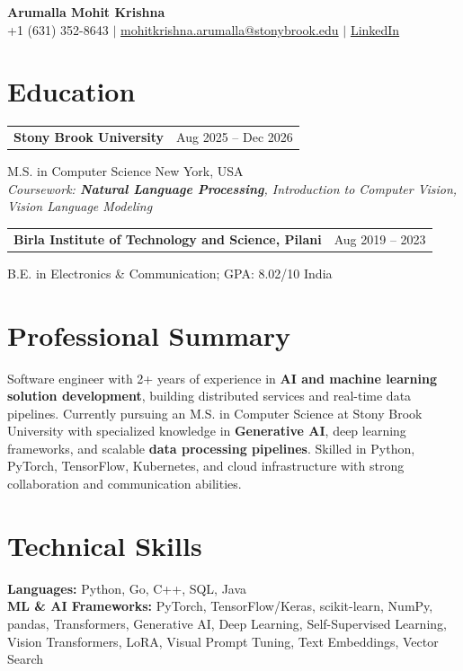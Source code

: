 \documentclass[letterpaper,10pt]{article}
\makeatletter
\newcommand{\entry}[2]{%
  \noindent
  \begin{tabularx}{\linewidth}
    {@{}>{\raggedright\arraybackslash}X@{\hspace{6pt}}r@{}}
    \textbf{#1} & #2
  \end{tabularx}\par
}
\makeatother
\begin{document}
\begin{center}
    {\LARGE\bfseries Arumalla Mohit Krishna}\\[3pt]
    +1 (631) 352-8643 $|$
    \href{mailto:mohitkrishna.arumalla@stonybrook.edu}
    {mohitkrishna.arumalla@stonybrook.edu} $|$
    \href{https://linkedin.com/in/mohit-krishna-arumalla}
    {LinkedIn}
\end{center}
\vspace{-8pt}

\section{Education}

\entry
  {\textbf{Stony Brook University}}
  {Aug 2025 -- Dec 2026}

M.S. in Computer Science \hfill New York, USA\\
\textit{
Coursework: \textbf{Natural Language Processing},
Introduction to Computer Vision, Vision Language Modeling
}
\vspace{3pt}

\entry
  {\textbf{Birla Institute of Technology and Science, Pilani}}
  {Aug 2019 -- 2023}

B.E. in Electronics \& Communication; GPA: 8.02/10 \hfill India
\section{Professional Summary}

Software engineer with 2+ years of experience in \textbf{AI and machine learning solution development},
building distributed services and real-time data pipelines. Currently pursuing an M.S.
in Computer Science at Stony Brook University with specialized knowledge in \textbf{Generative AI},
deep learning frameworks, and scalable \textbf{data processing pipelines}. Skilled in Python, PyTorch,
TensorFlow, Kubernetes, and cloud infrastructure with strong collaboration and communication abilities.
\section{Technical Skills}

\textbf{Languages:}
Python, Go, C++, SQL, Java\\

\textbf{ML \& AI Frameworks:}
PyTorch, TensorFlow/Keras, scikit-learn, NumPy, pandas,
Transformers, Generative AI, Deep Learning,
Self-Supervised Learning, Vision Transformers,
LoRA, Visual Prompt Tuning, Text Embeddings, Vector Search\\
\end{document}
